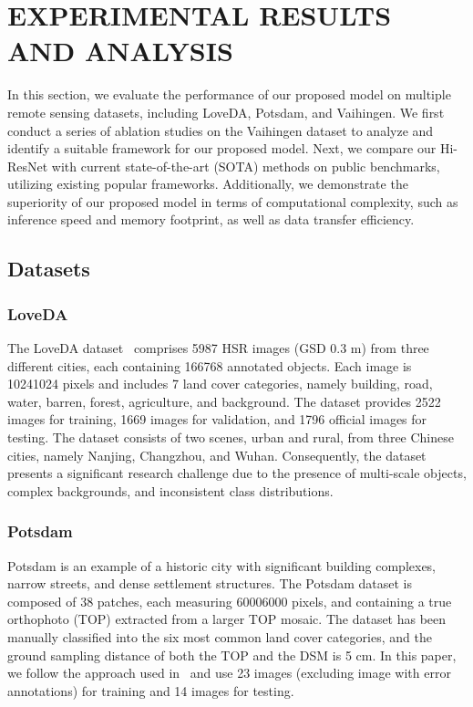 \documentclass[journal]{IEEEtran}
\begin{document}
\section{EXPERIMENTAL RESULTS AND ANALYSIS}
In this section, we evaluate the performance of our proposed model on multiple remote sensing datasets, including LoveDA, Potsdam, and Vaihingen. We first conduct a series of ablation studies on the Vaihingen dataset to analyze and identify a suitable framework for our proposed model. Next, we compare our Hi-ResNet with current state-of-the-art (SOTA) methods on public benchmarks, utilizing existing popular frameworks. Additionally, we demonstrate the superiority of our proposed model in terms of computational complexity, such as inference speed and memory footprint, as well as data transfer efficiency.

\subsection{Datasets}

\subsubsection{LoveDA}
The LoveDA dataset~\cite{wang2021loveda} comprises 5987 HSR images (GSD 0.3 m) from three different cities, each containing 166768 annotated objects. Each image is 10241024 pixels and includes 7 land cover categories, namely building, road, water, barren, forest, agriculture, and background. The dataset provides 2522 images for training, 1669 images for validation, and 1796 official images for testing. The dataset consists of two scenes, urban and rural, from three Chinese cities, namely Nanjing, Changzhou, and Wuhan. Consequently, the dataset presents a significant research challenge due to the presence of multi-scale objects, complex backgrounds, and inconsistent class distributions.

\subsubsection{Potsdam}
Potsdam is an example of a historic city with significant building complexes, narrow streets, and dense settlement structures. The Potsdam dataset is composed of 38 patches, each measuring 60006000 pixels, and containing a true orthophoto (TOP) extracted from a larger TOP mosaic. The dataset has been manually classified into the six most common land cover categories, and the ground sampling distance of both the TOP and the DSM is 5 cm. In this paper, we follow the approach used in~\cite{wang2022unetformer} and use 23 images (excluding image  with error annotations) for training and 14 images for testing.
\end{document}
